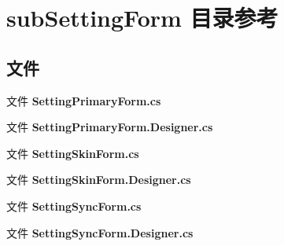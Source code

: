 \section{sub\+Setting\+Form 目录参考}
\label{dir_ff626b0ebbc5a34cf38c32f8e776a0a0}
\subsection*{文件}
\begin{DoxyCompactItemize}
\item 
文件 \textbf{ Setting\+Primary\+Form.\+cs}
\item 
文件 \textbf{ Setting\+Primary\+Form.\+Designer.\+cs}
\item 
文件 \textbf{ Setting\+Skin\+Form.\+cs}
\item 
文件 \textbf{ Setting\+Skin\+Form.\+Designer.\+cs}
\item 
文件 \textbf{ Setting\+Sync\+Form.\+cs}
\item 
文件 \textbf{ Setting\+Sync\+Form.\+Designer.\+cs}
\end{DoxyCompactItemize}
